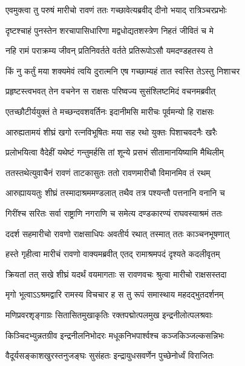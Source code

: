 
\twolineshloka
{एवमुक्त्वा तु परुषं मारीचो रावणं ततः}
{गच्छावेत्यब्रवीद् दीनो भयाद् रात्रिञ्चरप्रभोः} %

\twolineshloka
{दृष्टश्चाहं पुनस्तेन शरचापासिधारिणा}
{मद्वधोद्यतशस्त्रेण निहतं जीवितं च मे} %

\twolineshloka
{नहि रामं पराक्रम्य जीवन् प्रतिनिवर्तते}
{वर्तते प्रतिरूपोऽसौ यमदण्डहतस्य ते} %

\twolineshloka
{किं नु कर्तुं मया शक्यमेवं त्वयि दुरात्मनि}
{एष गच्छाम्यहं तात स्वस्ति तेऽस्तु निशाचर} %

\twolineshloka
{प्रहृष्टस्त्वभवत् तेन वचनेन स राक्षसः}
{परिष्वज्य सुसंश्लिष्टमिदं वचनमब्रवीत्} %

\twolineshloka
{एतच्छौटीर्ययुक्तं ते मच्छन्दवशवर्तिनः}
{इदानीमसि मारीचः पूर्वमन्यो हि राक्षसः} %

\twolineshloka
{आरुह्यतामयं शीघ्रं खगो रत्नविभूषितः}
{मया सह रथो युक्तः पिशाचवदनैः खरैः} %

\twolineshloka
{प्रलोभयित्वा वैदेहीं यथेष्टं गन्तुमर्हसि}
{तां शून्ये प्रसभं सीतामानयिष्यामि मैथिलीम्} %

\twolineshloka
{ततस्तथेत्युवाचैनं रावणं ताटकासुतः}
{ततो रावणमारीचौ विमानमिव तं रथम्} %

\twolineshloka
{आरुह्याययतुः शीघ्रं तस्मादाश्रममण्डलात्}
{तथैव तत्र पश्यन्तौ पत्तनानि वनानि च} %

\twolineshloka
{गिरींश्च सरितः सर्वा राष्ट्राणि नगराणि च}
{समेत्य दण्डकारण्यं राघवस्याश्रमं ततः} %

\twolineshloka
{ददर्श सहमारीचो रावणो राक्षसाधिपः}
{अवतीर्य रथात् तस्मात् ततः काञ्चनभूषणात्} %

\twolineshloka
{हस्ते गृहीत्वा मारीचं रावणो वाक्यमब्रवीत्}
{एतद् रामाश्रमपदं दृश्यते कदलीवृतम्} %

\twolineshloka
{क्रियतां तत् सखे शीघ्रं यदर्थं वयमागताः}
{स रावणवचः श्रुत्वा मारीचो राक्षसस्तदा} %

\twolineshloka
{मृगो भूत्वाऽऽश्रमद्वारि रामस्य विचचार ह}
{स तु रूपं समास्थाय महदद्भुतदर्शनम्} %

\twolineshloka
{मणिप्रवरशृङ्गाग्रः सितासितमुखाकृतिः}
{रक्तपद्मोत्पलमुख इन्द्रनीलोत्पलश्रवाः} %

\twolineshloka
{किञ्चिदभ्युन्नतग्रीव इन्द्रनीलनिभोदरः}
{मधूकनिभपार्श्वश्च कञ्जकिञ्जल्कसन्निभः} %

\twolineshloka
{वैदूर्यसङ्काशखुरस्तनुजङ्घः सुसंहतः}
{इन्द्रायुधसवर्णेन पुच्छेनोर्ध्वं विराजितः} %

